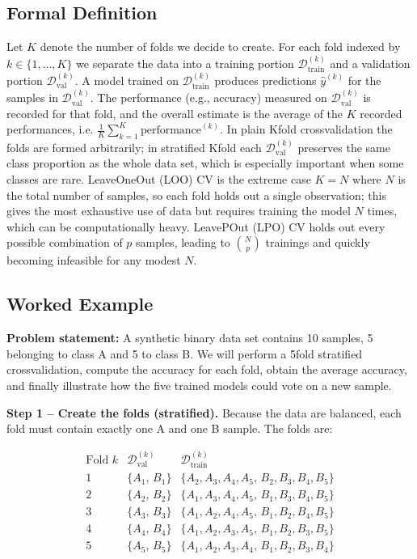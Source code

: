 \documentclass[12pt, a4paper]{article}
\begin{document}
\subsection{Formal Definition}
Let \(K\) denote the number of folds we decide to create.  
For each fold indexed by \(k\in\{1,\dots,K\}\) we separate the data into a training portion \(\mathcal{D}^{(k)}_{\text{train}}\) and a validation portion \(\mathcal{D}^{(k)}_{\text{val}}\).  
A model trained on \(\mathcal{D}^{(k)}_{\text{train}}\) produces predictions \(\hat{y}^{(k)}\) for the samples in \(\mathcal{D}^{(k)}_{\text{val}}\).  
The performance (e.g., accuracy) measured on \(\mathcal{D}^{(k)}_{\text{val}}\) is recorded for that fold, and the overall estimate is the average of the \(K\) recorded performances, i.e. \(\frac{1}{K}\sum_{k=1}^{K}\text{performance}^{(k)}\).  
In plain Kfold crossvalidation the folds are formed arbitrarily; in stratified Kfold each \(\mathcal{D}^{(k)}_{\text{val}}\) preserves the same class proportion as the whole data set, which is especially important when some classes are rare.  
LeaveOneOut (LOO) CV is the extreme case \(K=N\) where \(N\) is the total number of samples, so each fold holds out a single observation; this gives the most exhaustive use of data but requires training the model \(N\) times, which can be computationally heavy.  
LeavePOut (LPO) CV holds out every possible combination of \(p\) samples, leading to \(\binom{N}{p}\) trainings and quickly becoming infeasible for any modest \(N\).  

\subsection{Worked Example}
\textbf{Problem statement:}  
A synthetic binary data set contains 10 samples, 5 belonging to class A and 5 to class B.  
We will perform a 5fold stratified crossvalidation, compute the accuracy for each fold, obtain the average accuracy, and finally illustrate how the five trained models could vote on a new sample.  

\textbf{Step 1 -- Create the folds (stratified).}  
Because the data are balanced, each fold must contain exactly one A and one B sample.  
The folds are:  

\[
\begin{array}{c|c|c}
\text{Fold }k & \mathcal{D}^{(k)}_{\text{val}} & \mathcal{D}^{(k)}_{\text{train}} \\
\hline
1 & \{A_1,\,B_1\} & \{A_2,A_3,A_4,A_5,\,B_2,B_3,B_4,B_5\}\\
2 & \{A_2,\,B_2\} & \{A_1,A_3,A_4,A_5,\,B_1,B_3,B_4,B_5\}\\
3 & \{A_3,\,B_3\} & \{A_1,A_2,A_4,A_5,\,B_1,B_2,B_4,B_5\}\\
4 & \{A_4,\,B_4\} & \{A_1,A_2,A_3,A_5,\,B_1,B_2,B_3,B_5\}\\
5 & \{A_5,\,B_5\} & \{A_1,A_2,A_3,A_4,\,B_1,B_2,B_3,B_4\}
\end{array}
\]
\end{document}
